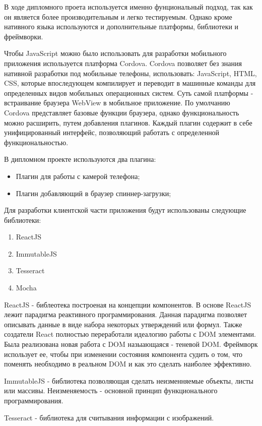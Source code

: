 В ходе дипломного проета используется именно фунциональный подход, так как он является более производительным и легко тестируемым. Однако кроме нативного языка используются и дополнительные платформы, библиотеки и фреймворки.

Чтобы JavaScript можно было использовать для разработки мобильного приложения используется платформа Cordova. Cordova позволяет без знания нативной разработки под мобильные телефоны, использовать: JavaScript, HTML, CSS, которые впоследующем компилирует и переводит в машинные команды для определенных видов мобильных операционных систем. Суть самой платформы - встраивание браузера WebView в мобильное приложение. По умолчанию Cordova представляет базовые функции браузера, однако функциональность можно расширить, путем добавления плагинов. Каждый плагин содержит в себе унифицированный интерфейс, позволяющий работать с определенной функциональностью. 

В дипломном проекте используются два плагина:
\begin{itemize}
  \item Плагин для работы с камерой телефона;
  \item Плагин добавляющий в браузер спиннер-загрузки;
\end{itemize}

Для разработки клиентской части приложения  будут использованы следующие библиотеки:
\begin{enumerate}
\item ReactJS
\item ImmutableJS
\item Tesseract
\item Mocha
\end{enumerate}

ReactJS - библеотека построеная на концепции компонентов. В основе ReactJS лежит парадигма реактивного программирования. Данная парадигма позволяет описывать данные в виде набора некоторых утверждений или формул. Также создатели React полностью переработали идеалогию работы с DOM элементами. Была реализована новая работа с DOM назыающаяся - теневой DOM. Фреймворк использует ее, чтобы при изменении состояния компонента судить о том, что поменять необходимо в реальном DOM и как это сделать наиболее эффективно.

ImmutableJS - библиотека позволяющая сделать неизменняемые объекты, листы или массивы. Неизменяемость - основной принцип функционального программирования.

Tesseract - библиотека для считывания информации с изображений.

